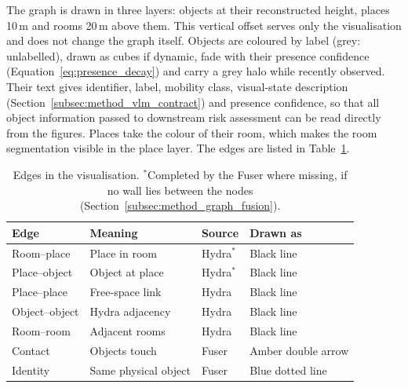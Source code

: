 {\small The graph is drawn in three layers: objects at their reconstructed height, places 10\,m and rooms 20\,m above them. This vertical offset serves only the visualisation and does not change the graph itself. Objects are coloured by label (grey: unlabelled), drawn as cubes if dynamic, fade with their presence confidence (Equation~\ref{eq:presence_decay}) and carry a grey halo while recently observed. Their text gives identifier, label, mobility class, visual-state description (Section~\ref{subsec:method_vlm_contract}) and presence confidence, so that all object information passed to downstream risk assessment can be read directly from the figures. Places take the colour of their room, which makes the room segmentation visible in the place layer. The edges are listed in Table~\ref{tab:results_visual_edges}.\par}
\begin{table}[!htb]
	\centering
	\small
	\caption{Edges in the visualisation. $^{*}$Completed by the Fuser where missing, if no wall lies between the nodes (Section~\ref{subsec:method_graph_fusion}).}
	\label{tab:results_visual_edges}
	\begin{tabular}{@{}llll@{}}
		\toprule
		Edge & Meaning & Source & Drawn as \\
		\midrule
		Room--place    & Place in room        & Hydra$^{*}$ & Black line \\
		Place--object  & Object at place      & Hydra$^{*}$ & Black line \\
		Place--place   & Free-space link      & Hydra       & Black line \\
		Object--object & Hydra adjacency      & Hydra       & Black line \\
		Room--room     & Adjacent rooms       & Hydra       & Black line \\
		Contact        & Objects touch        & Fuser       & Amber double arrow \\
		Identity       & Same physical object & Fuser       & Blue dotted line \\
		\bottomrule
	\end{tabular}
\end{table}

